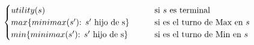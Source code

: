 \documentclass[preview]{standalone}
\begin{document}
\begin{align*}
\begin{cases}
                                 utility(s) \qquad &\text{si $s$ es terminal} \cr
                                 max\{minimax(\text{$s'$): $s'$ hijo de }$s$\}\qquad &\text{si es el turno de Max en $s$} \cr
                                 min\{minimax(\text{$s'$): $s'$ hijo de }$s$\}\qquad &\text{si es el turno de Min en $s$} \cr
                                 \end{cases}
\end{align*}
\end{document}

